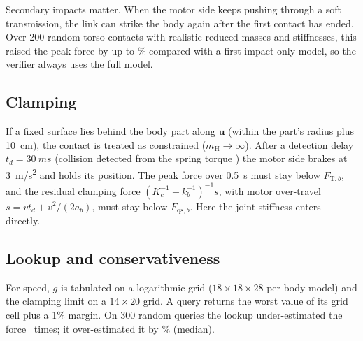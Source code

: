 \documentclass[journal]{IEEEtran}
\begin{document}
Secondary impacts matter. When the motor side keeps pushing through a soft transmission, the link can strike the body again after the first contact has ended. Over 200 random torso contacts with realistic reduced masses and stiffnesses, this raised the peak force by up to \secondaryMax\% compared with a first-impact-only model, so the verifier always uses the full model.

\subsection{Clamping}
If a fixed surface lies behind the body part along $\bm u$ (within the part's radius plus \SI{10}{cm}), the contact is treated as constrained ($m_\mathrm{H}\to\infty$). After a detection delay $t_d=\SI{30}{ms}$ (collision detected from the spring torque \cite{deluca2006}) the motor side brakes at \SI{3}{m/s^2} and holds its position. The peak force over \SI{0.5}{s} must stay below $F_{\mathrm{T},b}$, and the residual clamping force $(K_c^{-1}+k_b^{-1})^{-1}s$, with motor over-travel $s=vt_d+v^2/(2a_b)$, must stay below $F_{\mathrm{qs},b}$. Here the joint stiffness enters directly.

\subsection{Lookup and conservativeness}
For speed, $g$ is tabulated on a logarithmic grid ($18\times18\times28$ per body model) and the clamping limit on a $14\times20$ grid. A query returns the worst value of its grid cell plus a 1\% margin. On 300 random queries the lookup under-estimated the force \lookupUnder\ times; it over-estimated it by \lookupOverMed\% (median).
\end{document}
